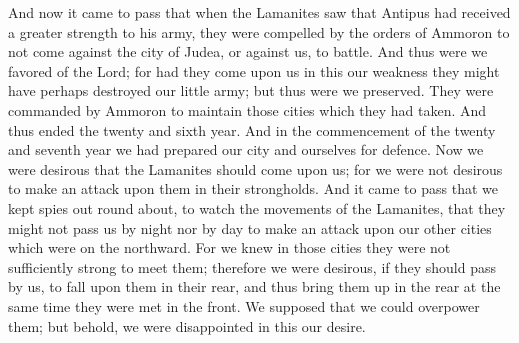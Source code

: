 And now it came to pass that when the Lamanites saw that Antipus had received a greater strength to his army, they were compelled by the orders of Ammoron to not come against the city of Judea, or against us, to battle.
\bverse \iffalse And thus were we favored of the Lord; for had they come upon us in this our weakness they might have perhaps destroyed our little army; but thus were we preserved. \fi
And thus were we favored of the Lord; for had they come upon us in this our weakness they might have perhaps destroyed our little army; but thus were we preserved.
\bverse \iffalse They were commanded by Ammoron to maintain those cities which they had taken. And thus ended the twenty and sixth year. And in the commencement of the twenty and seventh year we had prepared our city and ourselves for defence. \fi
They were commanded by Ammoron to maintain those cities which they had taken. And thus ended the twenty and sixth year. And in the commencement of the twenty and seventh year we had prepared our city and ourselves for defence.
\bverse \iffalse Now we were desirous that the Lamanites should come upon us; for we were not desirous to make an attack upon them in their strongholds. \fi
Now we were desirous that the Lamanites should come upon us; for we were not desirous to make an attack upon them in their strongholds.
\bverse \iffalse And it came to pass that we kept spies out round about, to watch the movements of the Lamanites, that they might not pass us by night nor by day to make an attack upon our other cities which were on the northward. \fi
And it came to pass that we kept spies out round about, to watch the movements of the Lamanites, that they might not pass us by night nor by day to make an attack upon our other cities which were on the northward.
\bverse \iffalse For we knew in those cities they were not sufficiently strong to meet them; therefore we were desirous, if they should pass by us, to fall upon them in their rear, and thus bring them up in the rear at the same time they were met in the front. We supposed that we could overpower them; but behold, we were disappointed in this our desire. \fi
For we knew in those cities they were not sufficiently strong to meet them; therefore we were desirous, if they should pass by us, to fall upon them in their rear, and thus bring them up in the rear at the same time they were met in the front. We supposed that we could overpower them; but behold, we were disappointed in this our desire.
\bverse \iffalse They durst not pass by us with their whole army, neither durst they with a part, lest they should not be sufficiently strong and they should fall. \fi
